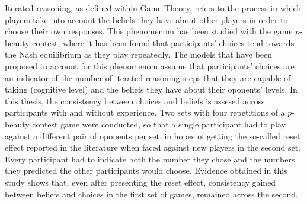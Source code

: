 \documentclass[
12pt, %
spanish, %
onehalfspacing, %
headsepline, %
]{MastersDoctoralThesis} %
\begin{document}
Iterated reasoning, as defined within Game Theory, refers to the process in which players take into account the beliefs they have about other players in order to choose their own responses. This phenomenom has been studied with the game $p$-beauty contest, where it has been found that participants' choices tend towards the Nash equilibrium as they play repeatedly. The models that have been proposed to account for this phenomenom assume that participants' choices are an indicator of the number of iterated reasoning steps that they are capable of taking (cognitive level) and the beliefs they have about their oponents' levels. In this thesis, the consistency between choices and beliefs is assesed across participants with and without experience. Two sets with four repetitions of a $p$-beauty contest game were conducted, so that a single participant had to play against a different pair of oponents per set, in hopes of getting the so-called reset effect reported in the literature when faced against new players in the second set. Every participant had to indicate both the number they chose and the numbers they predicted the other participants would choose. Evidence obtained in this study shows that, even after presenting the reset effect, consistency gained between beliefs and choices in the first set of games, remained across the second.\\


\end{document}
